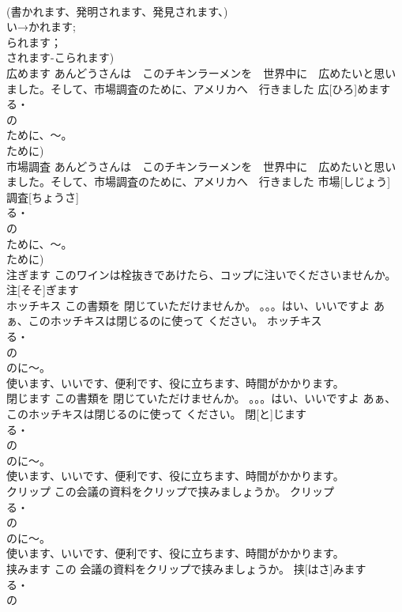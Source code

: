 \documentclass[8pt]{extreport}
\begin{document}
\begin{CJK}{UTF8}{min}
\\	(書かれます、発明されます、発見されます、)		
\\	い→かれます;
\\	られます；
\\	されます-こられます)
\\	広めます	あんどうさんは　このチキンラーメンを　世界中に　広めたいと思いました。そして、市場調査のために、アメリカへ　行きました	広[ひろ]めます			
\\	る・
\\	の　
\\	ために、～。
\\	ために)
\\	市場調査	あんどうさんは　このチキンラーメンを　世界中に　広めたいと思いました。そして、市場調査のために、アメリカへ　行きました	市場[しじょう] 調査[ちょうさ]				
\\	る・
\\	の　
\\	ために、～。
\\	ために)
\\	注ぎます	このワインは栓抜きであけたら、コップに注いでくださいませんか。	注[そそ]ぎます			
\\	ホッチキス	この書類を 閉じていただけませんか。 。。。はい、いいですよ あぁ、このホッチキスは閉じるのに使って ください。	ホッチキス			
\\	る・
\\	の　
\\	のに～。
\\	使います、いいです、便利です、役に立ちます、時間がかかります。		
\\	閉じます	この書類を 閉じていただけませんか。 。。。はい、いいですよ あぁ、このホッチキスは閉じるのに使って ください。	閉[と]じます			
\\	る・
\\	の　
\\	のに～。
\\	使います、いいです、便利です、役に立ちます、時間がかかります。	
\\	クリップ	この会議の資料をクリップで挟みましょうか。	クリップ			
\\	る・
\\	の　
\\	のに～。
\\	使います、いいです、便利です、役に立ちます、時間がかかります。		
\\	挟みます	この 会議の資料をクリップで挟みましょうか。	挟[はさ]みます			
\\	る・
\\	の　

\end{CJK}
\end{document}
